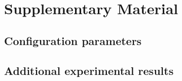 \chapter{Supplementary Material}

\section{Configuration parameters}

\section{Additional experimental results}
